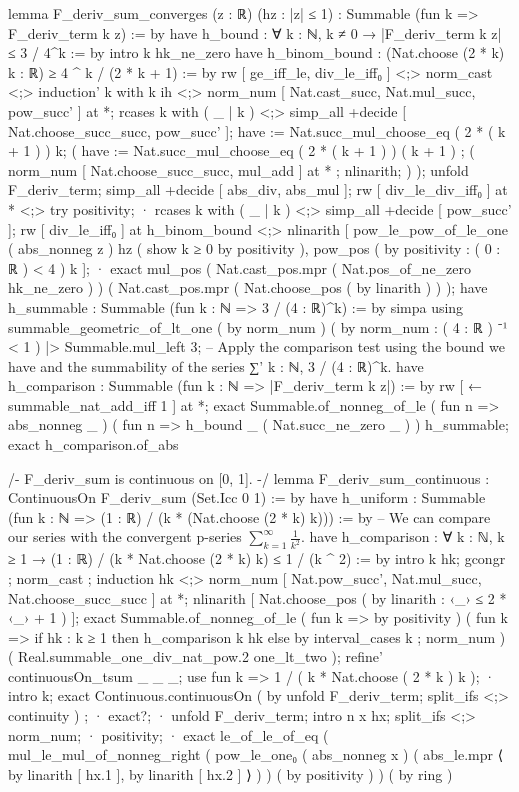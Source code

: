 lemma F_deriv_sum_converges (z : ℝ) (hz : |z| ≤ 1) : Summable (fun k => F_deriv_term k z) := by
  have h_bound : ∀ k : ℕ, k ≠ 0 → |F_deriv_term k z| ≤ 3 / 4^k := by
    intro k hk_ne_zero
    have h_binom_bound : (Nat.choose (2 * k) k : ℝ) ≥ 4 ^ k / (2 * k + 1) := by
      rw [ ge_iff_le, div_le_iff₀ ] <;> norm_cast <;> induction' k with k ih <;> norm_num [ Nat.cast_succ, Nat.mul_succ, pow_succ' ] at *;
      rcases k with ( _ | k ) <;> simp_all +decide [ Nat.choose_succ_succ, pow_succ' ];
      have := Nat.succ_mul_choose_eq ( 2 * ( k + 1 ) ) k; ( have := Nat.succ_mul_choose_eq ( 2 * ( k + 1 ) ) ( k + 1 ) ; ( norm_num [ Nat.choose_succ_succ, mul_add ] at * ; nlinarith; ) );
    unfold F_deriv_term;
    simp_all +decide [ abs_div, abs_mul ];
    rw [ div_le_div_iff₀ ] at * <;> try positivity;
    · rcases k with ( _ | k ) <;> simp_all +decide [ pow_succ' ];
      rw [ div_le_iff₀ ] at h_binom_bound <;> nlinarith [ pow_le_pow_of_le_one ( abs_nonneg z ) hz ( show k ≥ 0 by positivity ), pow_pos ( by positivity : ( 0 : ℝ ) < 4 ) k ];
    · exact mul_pos ( Nat.cast_pos.mpr ( Nat.pos_of_ne_zero hk_ne_zero ) ) ( Nat.cast_pos.mpr ( Nat.choose_pos ( by linarith ) ) );
  have h_summable : Summable (fun k : ℕ => 3 / (4 : ℝ)^k) := by
    simpa using summable_geometric_of_lt_one ( by norm_num ) ( by norm_num : ( 4 : ℝ ) ⁻¹ < 1 ) |> Summable.mul_left 3;
  -- Apply the comparison test using the bound we have and the summability of the series ∑' k : ℕ, 3 / (4 : ℝ)^k.
  have h_comparison : Summable (fun k : ℕ => |F_deriv_term k z|) := by
    rw [ ← summable_nat_add_iff 1 ] at *;
    exact Summable.of_nonneg_of_le ( fun n => abs_nonneg _ ) ( fun n => h_bound _ ( Nat.succ_ne_zero _ ) ) h_summable;
  exact h_comparison.of_abs

/-
F_deriv_sum is continuous on [0, 1].
-/
lemma F_deriv_sum_continuous : ContinuousOn F_deriv_sum (Set.Icc 0 1) := by
  have h_uniform : Summable (fun k : ℕ => (1 : ℝ) / (k * (Nat.choose (2 * k) k))) := by
    -- We can compare our series with the convergent p-series $\sum_{k=1}^{\infty} \frac{1}{k^2}$.
    have h_comparison : ∀ k : ℕ, k ≥ 1 → (1 : ℝ) / (k * Nat.choose (2 * k) k) ≤ 1 / (k ^ 2) := by
      intro k hk; gcongr ; norm_cast ; induction hk <;> norm_num [ Nat.pow_succ', Nat.mul_succ, Nat.choose_succ_succ ] at *;
      nlinarith [ Nat.choose_pos ( by linarith : ‹_› ≤ 2 * ‹_› + 1 ) ];
    exact Summable.of_nonneg_of_le ( fun k => by positivity ) ( fun k => if hk : k ≥ 1 then h_comparison k hk else by interval_cases k ; norm_num ) ( Real.summable_one_div_nat_pow.2 one_lt_two );
  refine' continuousOn_tsum _ _ _;
  use fun k => 1 / ( k * Nat.choose ( 2 * k ) k );
  · intro k; exact Continuous.continuousOn ( by unfold F_deriv_term; split_ifs <;> continuity ) ;
  · exact?;
  · unfold F_deriv_term;
    intro n x hx; split_ifs <;> norm_num;
    · positivity;
    · exact le_of_le_of_eq ( mul_le_mul_of_nonneg_right ( pow_le_one₀ ( abs_nonneg x ) ( abs_le.mpr ⟨ by linarith [ hx.1 ], by linarith [ hx.2 ] ⟩ ) ) ( by positivity ) ) ( by ring )

